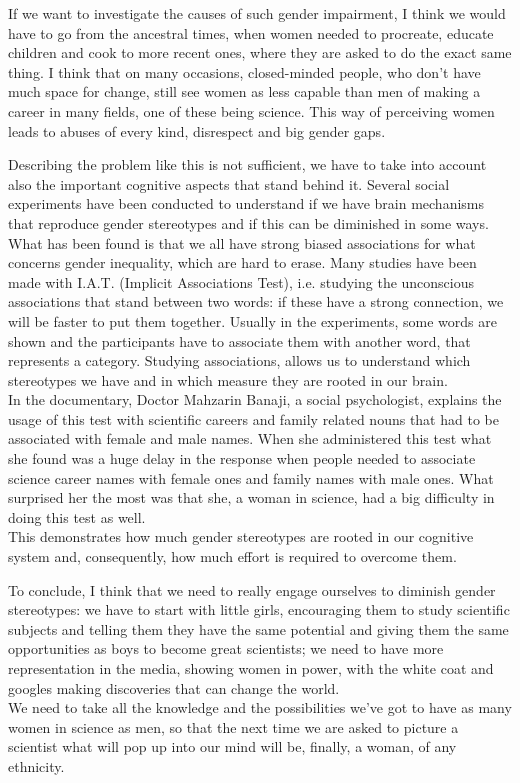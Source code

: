 If we want to investigate the causes of such gender impairment, I think we would have to go from the ancestral times, when women needed to procreate, educate children and cook to more recent ones, where they are asked to do the exact same thing. I think that on many occasions, closed-minded people, who don't have much space for change, still see women as less capable than men of making a career in many fields, one of these being science. This way of perceiving women leads to abuses of every kind, disrespect and big gender gaps. 

Describing the problem like this is not sufficient, we have to take into account also the important cognitive aspects that stand behind it. Several social experiments have been conducted to understand if we have brain mechanisms that reproduce gender stereotypes and if this can be diminished in some ways. What has been found is that we all have strong biased associations for what concerns gender inequality, which are hard to erase. 
Many studies have been made with I.A.T. (Implicit Associations Test), i.e. studying the unconscious associations that stand between two words: if these have a strong connection, we will be faster to put them together. Usually in the experiments, some words are shown and the participants have to associate them with another word, that represents a category. 
Studying associations, allows us to understand which stereotypes we have and in which measure they are rooted in our brain. \\
In the documentary, Doctor Mahzarin Banaji, a social psychologist, explains the usage of this test with scientific careers and family related nouns that had to be associated with female and male names. When she administered this test what she found was a huge delay in the response when people needed to associate science career names with female ones and family names with male ones. What surprised her the most was that she, a woman in science, had a big difficulty in doing this test as well. \\
This demonstrates how much gender stereotypes are rooted in our cognitive system and, consequently, how much effort is required to overcome them. 

To conclude, I think that we need to really engage ourselves to diminish gender stereotypes: we have to start with little girls, encouraging them to study scientific subjects and telling them they have the same potential and giving them the same opportunities as boys to become great scientists; we need to have more representation in the media, showing women in power, with the white coat and googles making discoveries that can change the world. \\
We need to take all the knowledge and the possibilities we've got to have as many women in science as men, so that the next time we are asked to picture a scientist what will pop up into our mind will be, finally, a woman, of any ethnicity.